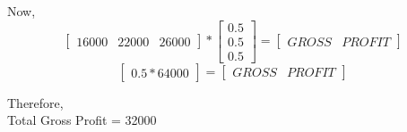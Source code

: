 \documentclass{article}
\begin{document}
\begin{itemize}
Now,\\

\[
 \begin{bmatrix}
  16000 & 22000 & 26000 
 \end{bmatrix} 
  *
  \begin{bmatrix}
       0.5\\
       0.5\\
       0.5
 \end{bmatrix}
   =
   \begin{bmatrix}
     GROSS & PROFIT
 \end{bmatrix}
  \]
  \[
  \begin{bmatrix}
       0.5*64000
 \end{bmatrix}
  =
  \begin{bmatrix}
       GROSS & PROFIT
 \end{bmatrix}
  \] 
  
  Therefore,\\
  Total Gross Profit = 32000
  
\end{itemize}
\end{document}
